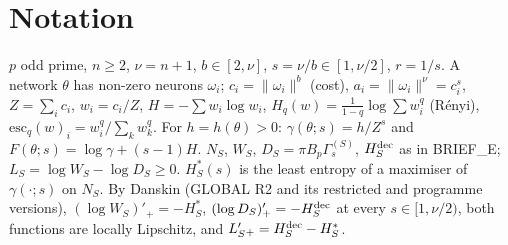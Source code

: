 \documentclass[11pt]{article}
\theoremstyle{remark}\newtheorem{remark}[theorem]{Remark}
\begin{document}
\section*{Notation}
$p$ odd prime, $n\ge2$, $\nu=n+1$, $b\in[2,\nu]$, $s=\nu/b\in[1,\nu/2]$, $r=1/s$. A network $\theta$ has non-zero neurons
$\omega_i$; $c_i=\|\omega_i\|^b$ (cost), $a_i=\|\omega_i\|^\nu=c_i^s$, $Z=\sum_ic_i$, $w_i=c_i/Z$, $H=-\sum w_i\log w_i$,
$H_q(w)=\frac1{1-q}\log\sum w_i^q$ (R\'enyi), $\mathrm{esc}_q(w)_i=w_i^q/\sum_kw_k^q$.
For $h=h(\theta)>0$: $\gamma(\theta;s)=h/Z^s$ and $F(\theta;s)=\log\gamma+(s-1)H$.
$N_S$, $W_S$, $D_S=\pi B_p\Gamma^{(S)}_s$, $H^{\rm dec}_S$ as in BRIEF\_E; $L_S=\log W_S-\log D_S\ge0$.
$H^*_S(s)$ is the least entropy of a maximiser of $\gamma(\cdot;s)$ on $N_S$.
By Danskin (GLOBAL R2 and its restricted and programme versions), $(\log W_S)'_+=-H^*_S$, $(\log D_S)'_+=-H^{\rm dec}_S$
at every $s\in[1,\nu/2)$, both functions are locally Lipschitz, and $L_S'{}_+=H^{\rm dec}_S-H^*_S$.
\end{document}

